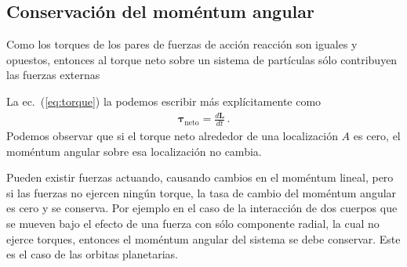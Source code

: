 \subsection{Conservación del moméntum angular}
Como los torques de los pares de fuerzas de acción reacción son iguales y opuestos, entonces al torque neto sobre un sistema de partículas sólo contribuyen las fuerzas externas

La ec.~(\ref{eq:torque}) la podemos escribir más explícitamente como
\begin{align}
  \label{eq:torqueneto}
  \boldsymbol{\tau}_{\text{neto}}=\frac{d\mathbf{L}}{dt}\,.
\end{align}
Podemos observar que si el torque neto alrededor de una localización
$A$ es cero, el moméntum angular sobre esa localización no cambia.

Pueden existir fuerzas actuando, causando cambios en el moméntum
lineal, pero si las fuerzas no ejercen ningún torque, la tasa de
cambio del moméntum angular es cero y se conserva. Por ejemplo en el
caso de la interacción de dos cuerpos que se mueven bajo el efecto de
una fuerza con sólo componente radial, la cual no ejerce torques,
entonces el moméntum angular del sistema se debe conservar. Este es el
caso de las orbitas planetarias.


